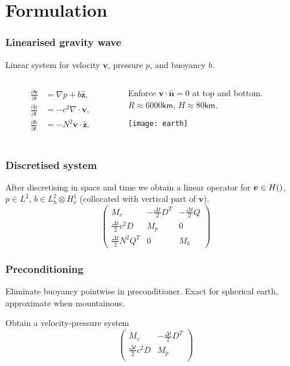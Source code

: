 \documentclass[presentation]{beamer}
\renewcommand{\vec}[1]{\ensuremath{\boldsymbol{#1}}}
\newcommand{\ddt}[1]{\frac{\partial #1}{\partial t}}
\newcommand{\zhat}{\hat{\vec{z}}}
\let\div\relax
\DeclareMathOperator{\div}{div}
\begin{document}
\section{Formulation}

\begin{frame}
  \frametitle{Linearised gravity wave}
  Linear system for velocity $\vec{v}$, pressure $p$, and buoyancy $b$.
\vspace{2em}

  \begin{columns}
    \begin{column}{0.4\textwidth}
      \begin{align*}
        \ddt{\vec{v}} &= \nabla p + b \zhat, \\
        \ddt{p} &= -c^2 \nabla\cdot \vec{v}, \\
        \ddt{b} &= -N^2\vec{v}\cdot\zhat.\\
      \end{align*}
    \end{column}
    \begin{column}{0.6\textwidth}
      Enforce $\vec{v}\cdot \hat{\vec{n}} = 0$ at top and bottom.\\
      $R\approx 6000\textsf{km}$, $H\approx 80\textsf{km}$. \\
      \begin{center}
        \texttt{[image: earth]}
      \end{center}
    \end{column}
  \end{columns}
\end{frame}

\begin{frame}
  \frametitle{Discretised system}
  After discretising in space and time we obtain a linear operator for
  $\vec{v} \in H(\div)$, $p \in L^2$, $b \in L^2_h \otimes H^1_v$ (collocated with
  vertical part of $\vec{v}$).
\begin{equation*}
\begin{pmatrix}
  M_v &
    -\frac{\Delta t}{2}D^T &
    -\frac{\Delta t}{2}Q\\[1ex]
  \frac{\Delta t}{2}c^2D & M_p & 0\\[1ex]
  \frac{\Delta t}{2}N^2Q^T & 0 & M_b
\end{pmatrix}
\end{equation*}
\end{frame}

\begin{frame}
  \frametitle{Preconditioning}
  Eliminate buoyancy pointwise in preconditioner.  Exact for spherical earth,
  approximate when mountainous.

  Obtain a velocity-pressure system
\begin{equation*}
\begin{pmatrix}
  M_v & -\frac{\Delta t}{2}D^T\\
  \frac{\Delta t}{2}c^2D & M_p\\
\end{pmatrix}
\end{equation*}

\end{frame}
\end{document}
